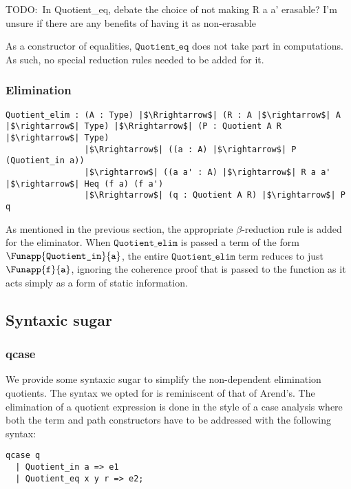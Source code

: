 \documentclass[12pt,twoside,maitrise]{dms}
\theoremstyle{definition}
\numberwithin{equation}{section}
\numberwithin{table}{chapter}
\numberwithin{figure}{chapter}
\newcommand\id[1] {\texttt{#1}}
\begin{document}
TODO:\ In Quotient\_eq, debate the choice of not making R a a' erasable? I'm
unsure if there are any benefits of having it as non-erasable

As a constructor of equalities, $\id{Quotient\_eq}$ does not take part in
computations. As such, no special reduction rules needed to be added for it.

\subsubsection*{Elimination}

\begin{verbatim}
Quotient_elim : (A : Type) |$\Rrightarrow$| (R : A |$\rightarrow$| A |$\rightarrow$| Type) |$\Rrightarrow$| (P : Quotient A R |$\rightarrow$| Type)
                |$\Rrightarrow$| ((a : A) |$\rightarrow$| P (Quotient_in a))
                |$\rightarrow$| ((a a' : A) |$\rightarrow$| R a a' |$\rightarrow$| Heq (f a) (f a')
                |$\Rrightarrow$| (q : Quotient A R) |$\rightarrow$| P q
\end{verbatim}

As mentioned in the previous section, the appropriate $\beta$-reduction rule is
added for the eliminator. When $\id{Quotient\_elim}$ is passed a term of the
form $\Funapp{\id{Quotient\_in}}{\id{a}}$, the entire $\id{Quotient\_elim}$ term
reduces to just $\Funapp{\id{f}}{\id{a}}$, ignoring the coherence proof that is
passed to the function as it acts simply as a form of static information.

\subsection{Syntaxic sugar}

\subsubsection*{qcase}

We provide some syntaxic sugar to simplify the non-dependent elimination
quotients. The syntax we opted for is reminiscent of that of
Arend's\cite{arend}. The elimination of a quotient expression is done in the
style of a case analysis where both the term and path constructors have to be
addressed with the following syntax:

\begin{verbatim}
qcase q
  | Quotient_in a => e1
  | Quotient_eq x y r => e2;
\end{verbatim}
\end{document}
